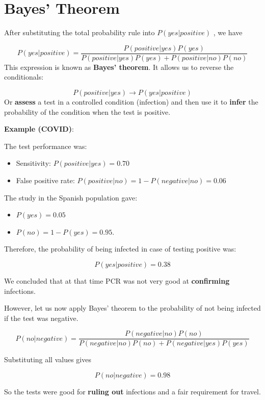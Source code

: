 \documentclass[
]{book}
\providecommand{\tightlist}{%
  \setlength{\itemsep}{0pt}\setlength{\parskip}{0pt}}
\begin{document}
\hypertarget{bayes-theorem}{%
\section{Bayes' Theorem}\label{bayes-theorem}}

After substituting the total probability rule into \(P(yes| positive)\) , we have

\[P(yes| positive)= \frac{P(positive|yes)P(yes)}{P(positive|yes)P(yes)+P(positive|no)P(no)}\]
This expression is known as \textbf{Bayes' theorem}. It allows us to reverse the conditionals:

\[P(positive|yes) \rightarrow P(yes| positive)\]
Or \textbf{assess} a test in a controlled condition (infection) and then use it to \textbf{infer} the probability of the condition when the test is positive.

\textbf{Example (COVID)}:

The test performance was:

\begin{itemize}
\item
  Sensitivity: \(P(positive| yes)= 0.70\)
\item
  False positive rate: \(P(positive| no)= 1- P(negative|no)=0.06\)
\end{itemize}

The study in the Spanish population gave:

\begin{itemize}
\tightlist
\item
  \(P(yes)=0.05\)
\item
  \(P(no)=1-P(yes)=0.95\).
\end{itemize}

Therefore, the probability of being infected in case of testing positive was:

\[P(yes| positive)= 0.38\]

We concluded that at that time PCR was not very good at \textbf{confirming} infections.

However, let us now apply Bayes' theorem to the probability of not being infected if the test was negative.

\[P(no|negative) = \frac{P(negative|no) P(no )}{ P(negative|no) P(no)+P(negative|yes)P(yes)}\]

Substituting all values gives

\[P(no| negative)= 0.98\]

So the tests were good for \textbf{ruling out} infections and a fair requirement for travel.
\end{document}
